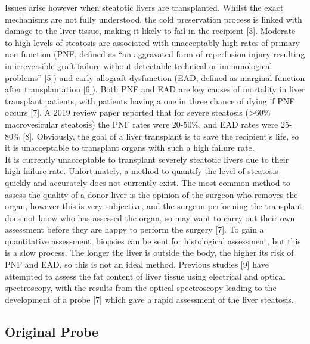 Issues arise however when steatotic livers are transplanted. Whilst the exact mechanisms are not fully understood, the cold preservation process is linked with damage to the liver tissue, making it likely to fail in the recipient [3]. Moderate to high levels of steatosis are associated with unacceptably high rates of primary non-function (PNF, defined as “an aggravated form of reperfusion injury resulting in irreversible graft failure without detectable technical or immunological problems” [5]) and early allograft dysfunction (EAD, defined as marginal function after transplantation [6]). Both PNF and EAD are key causes of mortality in liver transplant patients, with patients having a one in three chance of dying if PNF occurs [7]. A 2019 review paper reported that for severe steatosis (>60\% macrovesicular steatosis) the PNF rates were 20-50\%, and EAD rates were 25-80\% [8]. Obviously, the goal of a liver transplant is to save the recipient’s life, so it is unacceptable to transplant organs with such a high failure rate.\\

It is currently unacceptable to transplant severely steatotic livers due to their high failure rate. Unfortunately, a method to quantify the level of steatosis quickly and accurately does not currently exist. The most common method to assess the quality of a donor liver is the opinion of the surgeon who removes the organ, however this is very subjective, and the surgeon performing the transplant does not know who has assessed the organ, so may want to carry out their own assessment before they are happy to perform the surgery [7]. To gain a quantitative assessment, biopsies can be sent for histological assessment, but this is a slow process. The longer the liver is outside the body, the higher its risk of PNF and EAD, so this is not an ideal method. Previous studies [9] have attempted to assess the fat content of liver tissue using electrical and optical spectroscopy, with the results from the optical spectroscopy leading to the development of a probe [7] which gave a rapid assessment of the liver steatosis. \\


\subsection{Original Probe}